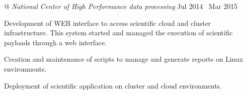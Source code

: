  @ \textit{National Center of High Performance data processing} \dotfill \enspace Jul 2014 \textemdash\ Mar 2015
\begin{minipage}[t]{\lcolwidth}
\raggedright
{\small \begin{zitemize}
  \item Development of WEB interface to access scientific cloud and cluster infrastructure. This system started and managed the execution of scientific payloads through a web interface.

  \item Creation and maintenance of scripts to manage and generate reports on Linux environments.

  \item Deployment of scientific application on cluster and cloud environments.
\end{zitemize}}
\end{minipage}%
\begin{minipage}[t]{\rcolwidth}
\raggedleft
{}
\end{minipage}

\vspace{-.25em}
